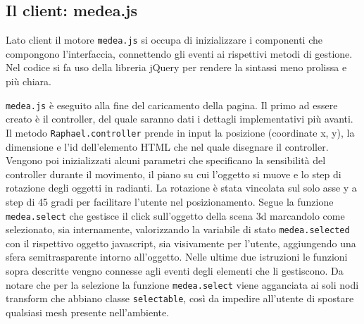 \subsection{Il client: medea.js}
Lato client il motore \texttt{medea.js} si occupa di inizializzare i componenti che compongono l'interfaccia, connettendo gli eventi ai rispettivi metodi di gestione. Nel codice si fa uso della libreria jQuery per rendere la sintassi meno prolissa e più chiara.


\texttt{medea.js} è eseguito alla fine del caricamento della pagina. Il primo ad essere creato è il controller, del quale saranno dati i dettagli implementativi più avanti. Il metodo \texttt{Raphael.controller} prende in input la posizione (coordinate x, y), la dimensione e l'id dell'elemento HTML che nel quale disegnare il controller. Vengono poi inizializzati alcuni parametri che specificano la sensibilità del controller durante il movimento, il piano su cui l'oggetto si muove e lo step di rotazione degli oggetti in radianti. La rotazione è stata vincolata sul solo asse y a step di 45 gradi per facilitare l'utente nel posizionamento. Segue la funzione \texttt{medea.select} che gestisce il click sull'oggetto della scena 3d marcandolo come selezionato, sia internamente, valorizzando la variabile di stato \texttt{medea.selected} con il rispettivo oggetto javascript, sia visivamente per l'utente, aggiungendo una sfera semitrasparente intorno all'oggetto. Nelle ultime due istruzioni le funzioni sopra descritte vengno connesse agli eventi degli elementi che li gestiscono. Da notare che per la selezione la funzione \texttt{medea.select} viene agganciata ai soli nodi transform che abbiano classe \texttt{selectable}, così da impedire all'utente di spostare qualsiasi mesh presente nell'ambiente.

